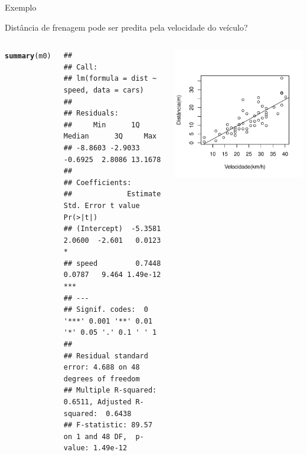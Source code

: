 \documentclass{beamer}\usepackage[]{graphicx}\usepackage[]{color}
\makeatletter
\newcommand{\hlstd}[1]{\textcolor[rgb]{0.345,0.345,0.345}{#1}}%
\newcommand{\hlkwd}[1]{\textcolor[rgb]{0.737,0.353,0.396}{\textbf{#1}}}%
\newenvironment{kframe}{%
 \def\at@end@of@kframe{}%
 \ifinner\ifhmode%
  \def\at@end@of@kframe{\end{minipage}}%
  \begin{minipage}{\columnwidth}%
 \fi\fi%
 \def\FrameCommand##1{\hskip\@totalleftmargin \hskip-\fboxsep
 \colorbox{shadecolor}{##1}\hskip-\fboxsep
     \hskip-\linewidth \hskip-\@totalleftmargin \hskip\columnwidth}%
 \MakeFramed {\advance\hsize-\width
   \@totalleftmargin\z@ \linewidth\hsize
   \@setminipage}}%
 {\par\unskip\endMakeFramed%
 \at@end@of@kframe}
\newenvironment{knitrout}{}{} %
\renewenvironment{knitrout}{\setlength{\topsep}{0mm}}{}
\makeatother
\begin{document}
\begin{frame}[fragile]{Exemplo}

 Distância de frenagem pode ser predita pela velocidade do veículo?

\begin{columns}[c]


\begin{knitrout}\tiny
{}\color{fgcolor}\begin{kframe}
\begin{alltt}
\hlkwd{summary}\hlstd{(m0)}
\end{alltt}
\begin{verbatim}
## 
## Call:
## lm(formula = dist ~ speed, data = cars)
## 
## Residuals:
##     Min      1Q  Median      3Q     Max 
## -8.8603 -2.9033 -0.6925  2.8086 13.1678 
## 
## Coefficients:
##             Estimate Std. Error t value Pr(>|t|)    
## (Intercept)  -5.3581     2.0600  -2.601   0.0123 *  
## speed         0.7448     0.0787   9.464 1.49e-12 ***
## ---
## Signif. codes:  0 '***' 0.001 '**' 0.01 '*' 0.05 '.' 0.1 ' ' 1
## 
## Residual standard error: 4.688 on 48 degrees of freedom
## Multiple R-squared:  0.6511,	Adjusted R-squared:  0.6438 
## F-statistic: 89.57 on 1 and 48 DF,  p-value: 1.49e-12
\end{verbatim}
\end{kframe}
\end{knitrout}


\begin{knitrout}\scriptsize
{}\color{fgcolor}
\includegraphics[width=1\linewidth]{figure/v2-1} 

\end{knitrout}

\end{columns}

\end{frame}
\end{document}
